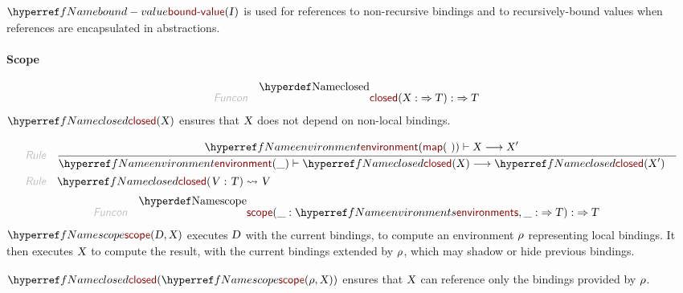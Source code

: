 $\SHADE{\NAMEREF{bound-value}
           (  \VAR{I} )}$ is used for references to non-recursive bindings and to
   recursively-bound values when references are encapsulated in abstractions.

\paragraph{Scope}\hypertarget{scope}{}\label{scope}

\begin{align*}
  \KEY{Funcon} \quad
  & \NAMEDECL{closed}(
                       \VAR{X} :  \TO \VAR{T}) 
    :  \TO \VAR{T} 
\end{align*}
$\SHADE{\NAMEREF{closed}
           (  \VAR{X} )}$ ensures that $\SHADE{\VAR{X}}$ does not depend on non-local bindings.

\begin{align*}
  \KEY{Rule} \quad
    & \RULE{
      & \NAMEREF{environment} (  \NAMEHYPER{../../../Values/Composite}{Maps}{map}
                                     (   \  ) ) \vdash \VAR{X} \TRANS 
          \VAR{X}'
      }{
      & \NAMEREF{environment} (  \_ ) \vdash \NAMEREF{closed}
                      (  \VAR{X} ) \TRANS 
          \NAMEREF{closed}
            (  \VAR{X}' )
      }
\\
  \KEY{Rule} \quad
    & \NAMEREF{closed}
        (  \VAR{V} : \VAR{T} ) \leadsto 
        \VAR{V}
\end{align*}
\begin{align*}
  \KEY{Funcon} \quad
  & \NAMEDECL{scope}(
                       \_ : \NAMEREF{environments}, \_ :  \TO \VAR{T}) 
    :  \TO \VAR{T} 
\end{align*}
$\SHADE{\NAMEREF{scope}
           (  \VAR{D}, 
                  \VAR{X} )}$ executes $\SHADE{\VAR{D}}$ with the current bindings, to compute an environment
  $\SHADE{\VAR{$\rho$}}$ representing local bindings. It then executes $\SHADE{\VAR{X}}$ to compute the result,
  with the current bindings extended by $\SHADE{\VAR{$\rho$}}$, which may shadow or hide previous
  bindings.

$\SHADE{\NAMEREF{closed}
           (  \NAMEREF{scope}
                   (  \VAR{$\rho$}, 
                          \VAR{X} ) )}$ ensures that $\SHADE{\VAR{X}}$ can reference only the bindings
  provided by $\SHADE{\VAR{$\rho$}}$.

